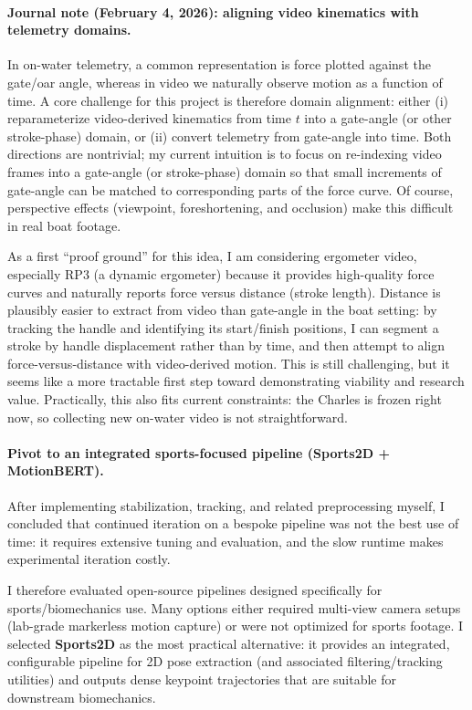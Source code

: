 \documentclass[11pt]{article}
\begin{document}
\paragraph{Journal note (February 4, 2026): aligning video kinematics with telemetry domains.}
In on-water telemetry, a common representation is force plotted against the gate/oar angle, whereas in video we naturally observe motion as a function of time. A core challenge for this project is therefore domain alignment: either (i) reparameterize video-derived kinematics from time $t$ into a gate-angle (or other stroke-phase) domain, or (ii) convert telemetry from gate-angle into time. Both directions are nontrivial; my current intuition is to focus on re-indexing video frames into a gate-angle (or stroke-phase) domain so that small increments of gate-angle can be matched to corresponding parts of the force curve. Of course, perspective effects (viewpoint, foreshortening, and occlusion) make this difficult in real boat footage.

As a first ``proof ground'' for this idea, I am considering ergometer video, especially RP3 (a dynamic ergometer) because it provides high-quality force curves and naturally reports force versus distance (stroke length). Distance is plausibly easier to extract from video than gate-angle in the boat setting: by tracking the handle and identifying its start/finish positions, I can segment a stroke by handle displacement rather than by time, and then attempt to align force-versus-distance with video-derived motion. This is still challenging, but it seems like a more tractable first step toward demonstrating viability and research value. Practically, this also fits current constraints: the Charles is frozen right now, so collecting new on-water video is not straightforward.

\paragraph{Pivot to an integrated sports-focused pipeline (Sports2D + MotionBERT).}
After implementing stabilization, tracking, and related preprocessing myself, I concluded that continued iteration on a bespoke pipeline was not the best use of time: it requires extensive tuning and evaluation, and the slow runtime makes experimental iteration costly.

I therefore evaluated open-source pipelines designed specifically for sports/biomechanics use. Many options either required multi-view camera setups (lab-grade markerless motion capture) or were not optimized for sports footage. I selected \textbf{Sports2D} as the most practical alternative: it provides an integrated, configurable pipeline for 2D pose extraction (and associated filtering/tracking utilities) and outputs dense keypoint trajectories that are suitable for downstream biomechanics.
\end{document}
